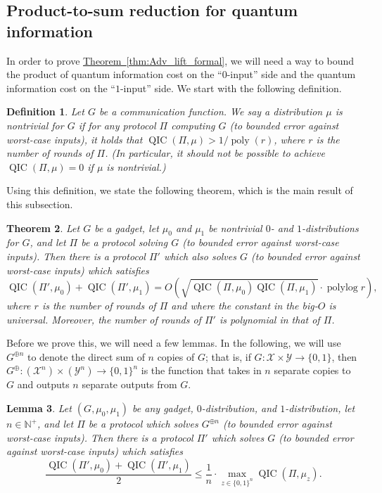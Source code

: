 \documentclass[10pt,a4paper]{article}
\newtheorem{theorem}{Theorem}
\newtheorem{lemma}[theorem]{Lemma}
\newtheorem{definition}[theorem]{Definition}
\theoremstyle{definition}
\newcommand{\thm}[1]{\hyperref[thm:#1]{Theorem~\ref*{thm:#1}}}
\DeclareMathOperator{\poly}{poly}
\DeclareMathOperator{\polylog}{polylog}
\newcommand{\B}{\{0,1\}}
\newcommand{\X}{\mathcal{X}}
\newcommand{\Y}{\mathcal{Y}}
\renewcommand{\>}{\rangle}
\newcommand{\<}{\langle}
\DeclareMathOperator{\QIC}{QIC}
\begin{document}
\subsection{Product-to-sum reduction for quantum information}
\label{sec:am_gm}

In order to prove \thm{Adv_lift_formal},
we will need a way to bound the
product of quantum information cost on the ``$0$-input'' side
and the quantum information cost on the ``$1$-input'' side.
We start with the following definition.

\begin{definition}
Let $G$ be a communication function. We say a distribution $\mu$
is \emph{nontrivial} for $G$ if for any protocol $\Pi$
computing $G$ (to bounded error against worst-case inputs),
it holds that $\QIC(\Pi,\mu)>1/\poly(r)$, where $r$ is the number
of rounds of $\Pi$.
(In particular, it should not be possible to achieve
$\QIC(\Pi,\mu)=0$ if $\mu$ is nontrivial.)
\end{definition}

Using this definition, we state the following theorem,
which is the main result of this subsection.

\begin{theorem}\label{thm:am_gm}
Let $G$ be a gadget, let $\mu_0$ and $\mu_1$
be nontrivial $0$- and $1$-distributions for $G$,
and let $\Pi$ be a protocol
solving $G$ (to bounded error against worst-case inputs).
Then there is a protocol $\Pi'$ which also solves $G$
(to bounded error against worst-case inputs) which satisfies
\[\QIC(\Pi',\mu_0)+\QIC(\Pi',\mu_1)
=O\left(\sqrt{\QIC(\Pi,\mu_0)\QIC(\Pi,\mu_1)}\cdot \polylog r\right),\]
where $r$ is the number of rounds of $\Pi$ and
where the constant in the big-$O$ is universal.
Moreover, the number of rounds of $\Pi'$ is polynomial in that
of $\Pi$.
\end{theorem}

Before we prove this, we will need a few lemmas.
In the following, we will use $G^{\oplus n}$ to denote the
direct sum of $n$ copies of $G$; that is, if $G\colon\X\times\Y\to\B$,
then $G^{\oplus}\colon(\X^n)\times(\Y^n)\to\B^n$ is the function
that takes in $n$ separate copies to $G$ and outputs $n$
separate outputs from $G$.

\begin{lemma}\label{lem:dir_sum}
Let $(G,\mu_0,\mu_1)$ be any gadget, $0$-distribution,
and $1$-distribution, let $n\in\mathbb{N}^+$, and
let $\Pi$ be a protocol which solves $G^{\oplus n}$
(to bounded error against worst-case inputs). Then
there is a protocol $\Pi'$ which solves $G$
(to bounded error against worst-case inputs) which satisfies
\[\frac{\QIC(\Pi',\mu_0)+\QIC(\Pi',\mu_1)}{2}
\le \frac{1}{n}\cdot \max_{z\in\B^n}
\QIC\left(\Pi,\mu_z\right).\]
\end{lemma}
\end{document}
